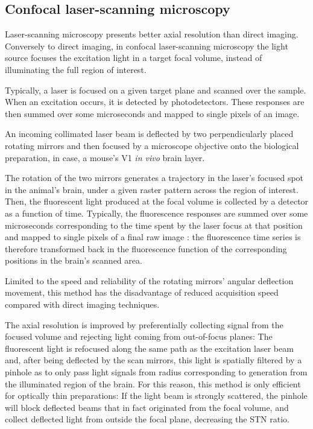 \subsection{Confocal laser-scanning microscopy}

Laser-scanning microscopy presents better axial resolution than direct imaging. Conversely to direct imaging, in confocal laser-scanning microscopy the light source focuses the excitation light in a target focal volume, instead of illuminating the full region of interest. 

Typically, a laser is focused on a given target plane and scanned over the sample. When an excitation occurs, it is detected by photodetectors. These responses are then summed over some microseconds and mapped to single pixels of an image.

An incoming collimated laser beam is deflected by two perpendicularly placed rotating mirrors and then focused by a microscope objective onto the biological preparation, in case, a mouse's V1 \textit{in vivo} brain layer.

The rotation of the two mirrors generates a trajectory in the laser's focused spot in the animal's brain, under a given raster pattern across the region of interest. Then, the fluorescent light produced at the focal volume is collected by a detector as a function of time. Typically, the fluorescence responses are summed over some microseconds corresponding to the time spent by the laser focus at that position and mapped to single pixels of a final raw image : the fluorescence time series is therefore transformed back in the fluorescence function of the corresponding positions in the brain's scanned area. 

Limited to the speed and reliability of the rotating mirrors' angular deflection movement, this method has the disadvantage of reduced acquisition speed compared with direct imaging techniques. 

The axial resolution is improved by preferentially collecting signal from the focused volume and rejecting light coming from out-of-focus planes: The fluorescent light is refocused along the same path as the excitation laser beam and, after being deflected by the scan mirrors, this light is spatially filtered by a pinhole as to only pass light signals from radius corresponding to generation from the illuminated region of the brain. For this reason, this method is only efficient for optically thin preparations: If the light beam is strongly scattered, the pinhole will block deflected beams that in fact originated from the focal volume, and collect deflected light from outside the focal plane, decreasing the STN ratio. 


